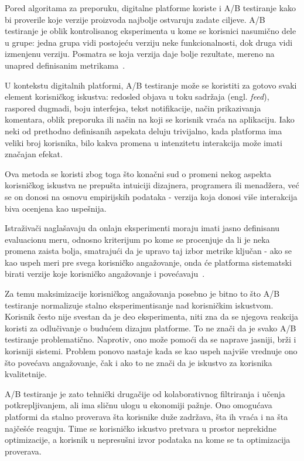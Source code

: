 Pored algoritama za preporuku, digitalne platforme koriste i A/B testiranje kako bi proverile koje verzije proizvoda najbolje ostvaruju zadate ciljeve. A/B testiranje je oblik kontrolisanog eksperimenta u kome se korisnici nasumično dele u grupe: jedna grupa vidi postojeću verziju neke funkcionalnosti, dok druga vidi izmenjenu verziju. Posmatra se koja verzija daje bolje rezultate, mereno na unapred definisanim metrikama~\cite{kohavi2017online}.

U kontekstu digitalnih platformi, A/B testiranje može se koristiti za gotovo svaki element korisničkog iskustva:  redosled objava u toku sadržaja (engl. \textit{feed}), raspored dugmadi, boju interfejsa, tekst notifikacije, način prikazivanja komentara, oblik preporuka ili način na koji se korisnik vraća na aplikaciju. Iako neki od prethodno definisanih aspekata deluju trivijalno, kada platforma ima veliki broj korisnika, bilo kakva promena u intenzitetu interakcija može imati značajan efekat.

Ova metoda se koristi zbog toga što konačni sud o promeni nekog aspekta korisničkog iskustva ne prepušta intuiciji dizajnera, programera ili menadžera, već se on donosi na osnovu empirijskih podataka - verzija koja donosi više interakcija biva ocenjena kao uspešnija.

Istraživači naglašavaju da onlajn eksperimenti moraju imati jasno definisanu evaluacionu meru, odnosno kriterijum po kome se procenjuje da li je neka promena zaista bolja, smatrajući da je upravo taj izbor metrike ključan - ako se kao uspeh meri pre svega korisničko angažovanje, onda će platforma sistematski birati verzije koje korisničko angažovanje i povećavaju~\cite{kohavi2017online}.

Za temu maksimizacije korisničkog angažovanja posebno je bitno to što A/B testiranje normalizuje stalno eksperimentisanje nad korisničkim iskustvom. Korisnik često nije svestan da je deo eksperimenta, niti zna da se njegova reakcija koristi za odlučivanje o budućem dizajnu platforme. To ne znači da je svako A/B testiranje problematično. Naprotiv, ono može pomoći da se naprave jasniji, brži i korisniji sistemi. Problem ponovo nastaje kada se kao uspeh najviše vrednuje ono što povećava angažovanje, čak i ako to ne znači da je iskustvo za korisnika kvalitetnije.

A/B testiranje je zato tehnički drugačije od kolaborativnog filtriranja i učenja potkrepljivanjem, ali ima sličnu ulogu u ekonomiji pažnje. Ono omogućava platformi da stalno proverava šta korisnike duže zadržava, šta ih vraća i na šta najčešće reaguju. Time se korisničko iskustvo pretvara u prostor neprekidne optimizacije, a korisnik u nepresušni izvor podataka na kome se ta optimizacija proverava.

